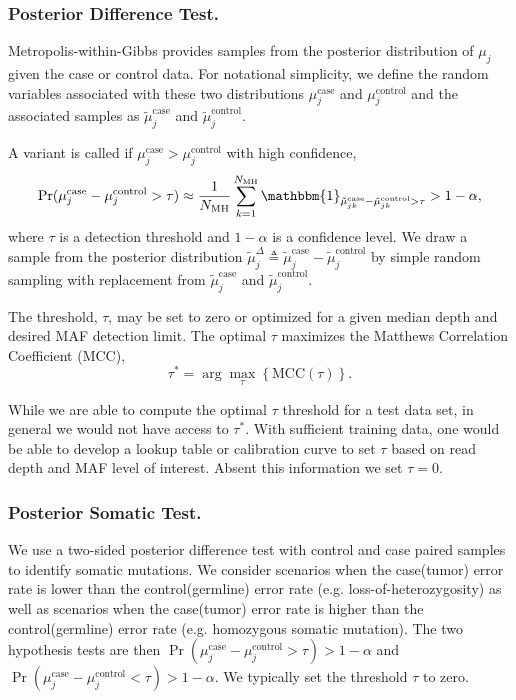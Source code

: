 \documentclass{bioinfo}
\begin{document}
\subsubsection*{Posterior Difference Test.}
Metropolis-within-Gibbs provides samples from the posterior distribution of $\mu_j$ given the case or control data. For notational simplicity, we define the random variables associated with these two distributions $\mu_j^{\text{case}}$ and $\mu_j^{\text{control}}$ and the associated samples as $\tilde{\mu}_j^{\text{case}}$ and $\tilde{\mu}_j^{\text{control}}$.

A variant is called if $\mu_j^{\text{case}} > \mu_j^{\text{control}}$ with high confidence,
\begin{equation}\label{eqn:bayes_test}
	\Pr( \mu_j^{\text{case}} - \mu_j^{\text{control}}  > \tau ) \approx \frac{1}{N_{\text{MH}}} \sum_{k=1}^{N_{\text{MH}}} \mathbbm{1}_{\tilde{\mu}_{jk}^{\text{case}} - \tilde{\mu}_{jk}^{\text{control}} > \tau } > 1-\alpha,
\end{equation}
where $\tau$ is a detection threshold and $1-\alpha$ is a confidence level. We draw a sample from the posterior distribution $\tilde{\mu}_j^{\Delta} \triangleq \tilde{\mu}_j^{\text{case}} - \tilde{\mu}_j^{\text{control}}$ by simple random sampling with replacement from $\tilde{\mu}_j^{\text{case}}$ and $\tilde{\mu}_j^{\text{control}}$.

The threshold, $\tau$, may be set to zero or optimized for a given median depth and desired MAF detection limit. The optimal $\tau$ maximizes the Matthews Correlation Coefficient (MCC),
\begin{equation}
	\tau^* = \arg\max_\tau \left\{ \text{MCC}(\tau)\right\}.
\end{equation}

While we are able to compute the optimal $\tau$ threshold for a test data set, in general we would not have access to $\tau^*$. With sufficient training data, one would be able to develop a lookup table or calibration curve to set $\tau$ based on read depth and MAF level of interest. Absent this information we set $\tau = 0$.

\subsubsection*{Posterior Somatic Test.}

We use a two-sided posterior difference test with control and case paired samples to identify somatic mutations. We consider scenarios when the case(tumor) error rate is lower than the control(germline) error rate (e.g. loss-of-heterozygosity) as well as scenarios when the case(tumor) error rate is higher than the control(germline) error rate (e.g. homozygous somatic mutation). The two hypothesis tests are then $\Pr( \mu_j^{\text{case}} - \mu_j^{\text{control}} > \tau ) > 1-\alpha$ and $\Pr( \mu_j^{\text{case}} - \mu_j^{\text{control}} < \tau ) > 1-\alpha$. We typically set the threshold $ \tau $ to zero.
\end{document}
